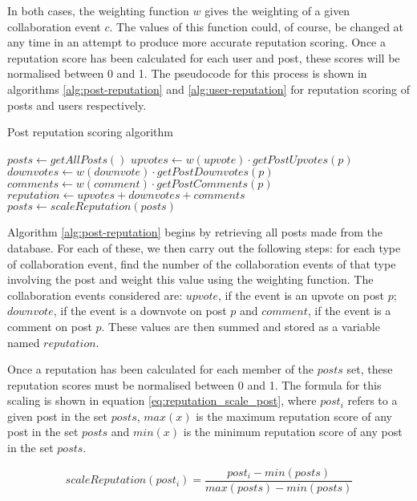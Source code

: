 \noindent
In both cases, the weighting function \(w\) gives the weighting of a given collaboration event \(c\). The values of this function could, of course, be changed at any time in an attempt to produce more accurate reputation scoring. Once a reputation score has been calculated for each user and post, these scores will be normalised between 0 and 1. The pseudocode for this process is shown in algorithms \ref{alg:post-reputation} and \ref{alg:user-reputation} for reputation scoring of posts and users respectively.

\begin{algorithm}[H]
\caption{Post reputation scoring algorithm}
\label{alg:post-reputation}
\begin{algorithmic}[1]
\State $posts\gets getAllPosts()$
    \State $upvotes\gets w(upvote)\cdot getPostUpvotes(p)$
    \State $downvotes\gets w(downvote)\cdot getPostDownvotes(p)$
    \State $comments\gets w(comment)\cdot getPostComments(p)$
    \State $reputation\gets upvotes + downvotes + comments$
\EndFor
\State $posts\gets scaleReputation(posts)$
\end{algorithmic}
\end{algorithm}

\noindent
Algorithm \ref{alg:post-reputation} begins by retrieving all posts made from the database. For each of these, we then carry out the following steps: for each type of collaboration event, find the number of the collaboration events of that type involving the post and weight this value using the weighting function. The collaboration events considered are: \(upvote\), if the event is an upvote on post \(p\); \(downvote\), if the event is a downvote on post \(p\) and \(comment\), if the event is a comment on post \(p\). These values are then summed and stored as a variable named \(reputation\).

Once a reputation has been calculated for each member of the \(posts\) set, these reputation scores must be normalised between 0 and 1. The formula for this scaling is shown in equation \ref{eq:reputation_scale_post}, where $post_i$ refers to a given post in the set \(posts\), \(max(x)\) is the maximum reputation score of any post in the set \(posts\) and $min(x)$ is the minimum reputation score of any post in the set \(posts\).

\begin{equation}
    \label{eq:reputation_scale_post}
    scaleReputation(post_i) = \frac{post_i - min(posts)}{max(posts) - min(posts)}
\end{equation}

